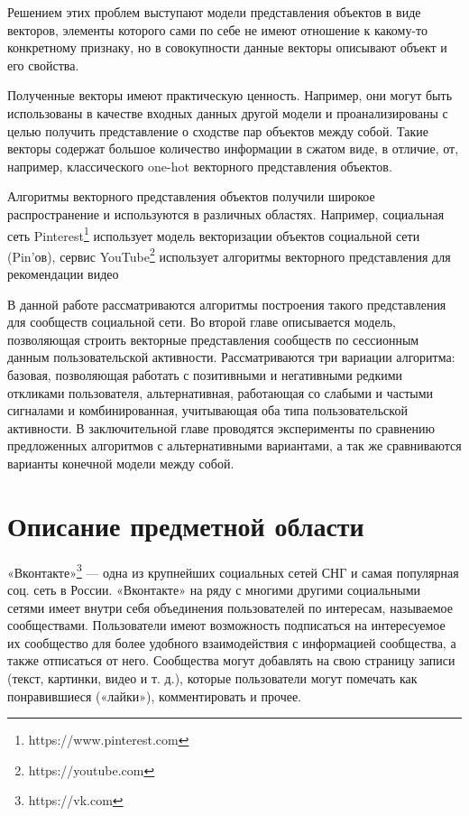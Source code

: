 \documentclass[times,specification,annotation]{itmo-student-thesis}
\begin{document}
Решением этих проблем выступают модели представления объектов в виде векторов, элементы
которого сами по себе не имеют отношение к какому-то конкретному признаку, но
в совокупности данные векторы описывают объект и его свойства.

Полученные векторы имеют практическую ценность. Например, они могут быть использованы в
качестве входных данных другой модели и проанализированы с целью
получить представление о сходстве пар объектов между собой. Такие векторы содержат большое количество информации в сжатом виде, в отличие, от, например, классического one-hot векторного представления объектов.

Алгоритмы векторного представления объектов получили широкое распространение и используются в различных областях. Например, социальная сеть Pinterest\footnote{https://www.pinterest.com} \cite{Liu2017} использует модель векторизации объектов социальной сети (Pin'ов), сервис YouTube\footnote{https://youtube.com} использует алгоритмы векторного представления для рекомендации видео\cite{Covington2016} 

В данной работе рассматриваются алгоритмы построения такого представления для сообществ социальной сети. Во второй главе описывается модель, позволяющая строить векторные представления сообществ по сессионным данным пользовательской активности. Рассматриваются три вариации алгоритма: базовая, позволяющая работать с позитивными и негативными редкими откликами пользователя, альтернативная, работающая со слабыми и частыми сигналами и комбинированная, учитывающая оба типа пользовательской активности. В заключительной главе проводятся эксперименты по сравнению предложенных алгоритмов с альтернативными вариантами, а так же сравниваются варианты конечной модели между собой. 

\chapter{Описание предметной области}

«Вконтакте»\footnote{https://vk.com} --- одна из крупнейших социальных сетей СНГ и самая
популярная соц. сеть в России. «Вконтакте» на ряду с многими другими
социальными сетями имеет внутри себя объединения пользователей по интересам,
называемое сообществами. Пользователи имеют возможность подписаться на
интересуемое их сообщество для более удобного взаимодействия с информацией
сообщества, а также отписаться от него. Сообщества могут добавлять на свою
страницу записи (текст, картинки, видео и т. д.), которые пользователи могут
помечать как понравившиеся («лайки»), комментировать и прочее.
\end{document}
